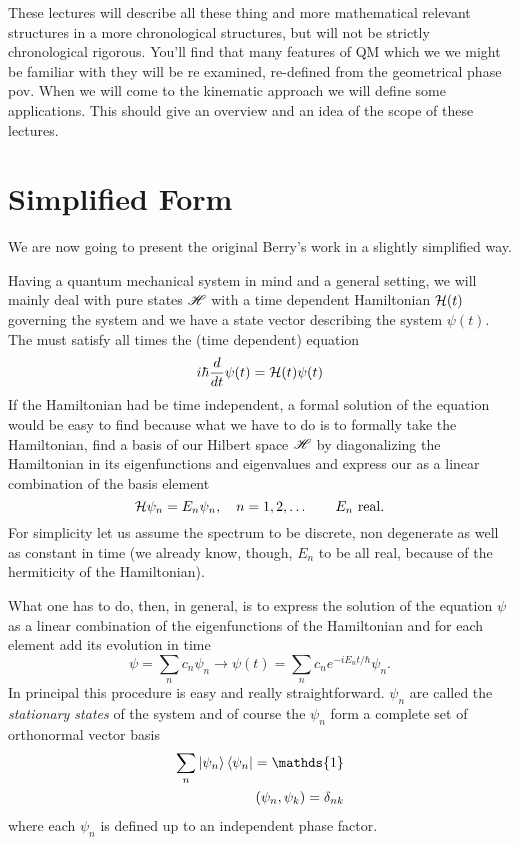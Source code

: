 These lectures will describe all these thing and more mathematical relevant structures in a more chronological structures, but will not be strictly chronological rigorous. You'll find that many features of QM which we we might be familiar with they will be re examined, re-defined from the geometrical phase pov. When we will come to the kinematic approach we will define some applications. This should give an overview and an idea of the scope of these lectures.   
\section{Simplified Form}
We are now going to present the original Berry's work in a slightly simplified way. 

Having a quantum mechanical system in mind and a general setting, we will mainly deal with pure states $ \mathscr{H} $ with a time dependent Hamiltonian $ \mathcal{H}(t) $ governing the system and we have a state vector describing the system $ \psi(t) $.
The \wf must satisfy all times the (time dependent) \Sch equation 
\begin{equation}
i\hbar \frac{d}{dt}\psi(t)=\mathcal{H}(t)\psi(t)
\label{eq:2.1}
\end{equation}
If the Hamiltonian had be time independent, a formal solution of the \Sch equation would be easy to find because what we have to do is to formally take the Hamiltonian, find a basis of our Hilbert space $ \mathscr{H} $ by diagonalizing the Hamiltonian in its eigenfunctions and eigenvalues and express our \wf as a linear combination of the basis element
\begin{equation}
\mathcal{H} \psi_n=E_n\psi_n, \quad n=1,2,\dots \qquad E_n \text{ real}. 
\end{equation}
For simplicity let us assume the spectrum to be discrete, non degenerate as well as constant in time (we already know, though, $ E_n $ to be all real, because of the hermiticity of the Hamiltonian).

What one has to do, then, in general, is to express the solution of the \Sch equation $ \psi $ as a linear combination of the eigenfunctions of the Hamiltonian and for each element add its evolution in time \begin{equation}
\psi=\sum_n c_n\psi_n\to \psi(t)=\sum_n c_n e^{-iE_nt/\hbar}\psi_n.
\label{eq:2.3}
\end{equation}
In principal this procedure is easy and really straightforward. 
$ \psi_n $ are called the \emph{stationary states} of the system and of course the $ \psi_n $ form a complete set of orthonormal vector basis
\begin{align}
	\sum_n \Ket{\psi_n}\Bra{\psi_n}=\mathds{1}\\
	\left(\psi_n,\psi_k\right) = \delta_{nk}
\end{align}
where each $ \psi_n $ is defined up to an independent phase factor.

